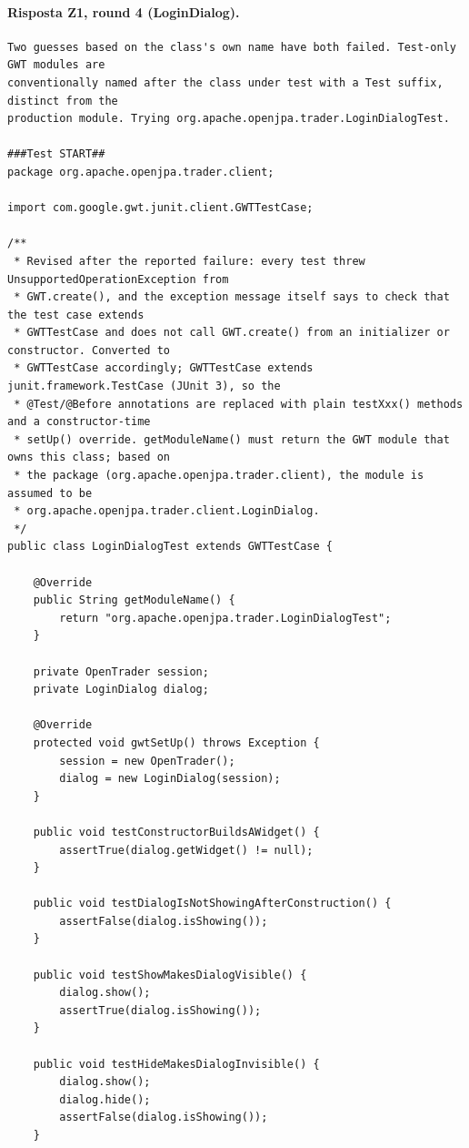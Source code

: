 \paragraph*{Risposta Z1, round 4 (LoginDialog).}
\label{risposta:ld-z1-r4}
\begin{lstlisting}
Two guesses based on the class's own name have both failed. Test-only GWT modules are
conventionally named after the class under test with a Test suffix, distinct from the
production module. Trying org.apache.openjpa.trader.LoginDialogTest.

###Test START##
package org.apache.openjpa.trader.client;

import com.google.gwt.junit.client.GWTTestCase;

/**
 * Revised after the reported failure: every test threw UnsupportedOperationException from
 * GWT.create(), and the exception message itself says to check that the test case extends
 * GWTTestCase and does not call GWT.create() from an initializer or constructor. Converted to
 * GWTTestCase accordingly; GWTTestCase extends junit.framework.TestCase (JUnit 3), so the
 * @Test/@Before annotations are replaced with plain testXxx() methods and a constructor-time
 * setUp() override. getModuleName() must return the GWT module that owns this class; based on
 * the package (org.apache.openjpa.trader.client), the module is assumed to be
 * org.apache.openjpa.trader.client.LoginDialog.
 */
public class LoginDialogTest extends GWTTestCase {

    @Override
    public String getModuleName() {
        return "org.apache.openjpa.trader.LoginDialogTest";
    }

    private OpenTrader session;
    private LoginDialog dialog;

    @Override
    protected void gwtSetUp() throws Exception {
        session = new OpenTrader();
        dialog = new LoginDialog(session);
    }

    public void testConstructorBuildsAWidget() {
        assertTrue(dialog.getWidget() != null);
    }

    public void testDialogIsNotShowingAfterConstruction() {
        assertFalse(dialog.isShowing());
    }

    public void testShowMakesDialogVisible() {
        dialog.show();
        assertTrue(dialog.isShowing());
    }

    public void testHideMakesDialogInvisible() {
        dialog.show();
        dialog.hide();
        assertFalse(dialog.isShowing());
    }


\end{lstlisting}
